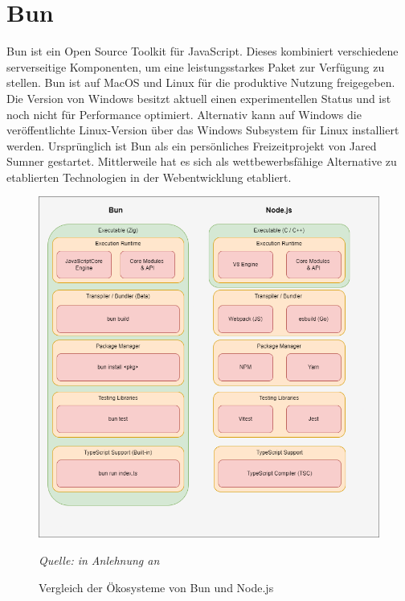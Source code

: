 \section{Bun} \label{sec:foundations-Bun}
Bun ist ein Open Source Toolkit für JavaScript. Dieses kombiniert verschiedene serverseitige Komponenten, um eine leistungsstarkes Paket zur Verfügung zu stellen. Bun ist auf MacOS und Linux für die produktive Nutzung freigegeben. Die Version von Windows besitzt aktuell einen experimentellen Status und ist noch nicht für Performance optimiert. Alternativ kann auf Windows die veröffentlichte Linux-Version über das Windows Subsystem für Linux installiert werden. Ursprünglich ist Bun als ein persönliches Freizeitprojekt von Jared Sumner gestartet. Mittlerweile hat es sich als wettbewerbsfähige Alternative zu etablierten Technologien in der Webentwicklung etabliert.\cite{Sumner.2023c, Tyson.2023}\\

\begin{figure}[h]
	\centering
	\includegraphics[width=\linewidth]{./images/EcosystemBunvsNode.png}
	\caption{Vergleich der Ökosysteme von Bun und Node.js}
	\label{fig:ecosystemComparison}
	\textit{Quelle: in Anlehnung an \cite{Springer.2022, OvenSh.2023c}}
\end{figure}

